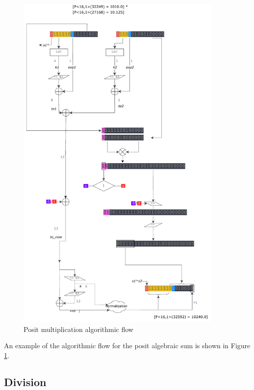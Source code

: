\begin{figure}
    \begin{center}
    \includegraphics[width=0.90\textwidth]{figures/posit_mul_flow.pdf}
    \caption{Posit multiplication algorithmic flow}
    \label{fig:mulflow}
    \end{center}
\end{figure}

An example of the algorithmic flow for the posit algebraic sum is shown in Figure \ref{fig:mulflow}.

\subsection{Division}



